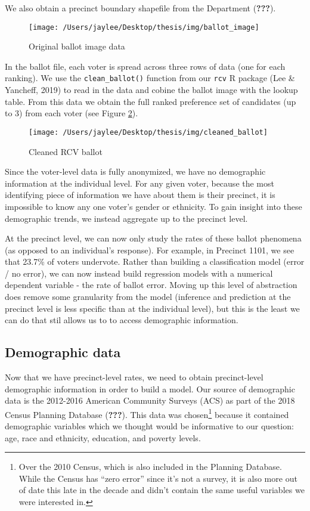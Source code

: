 \documentclass[12pt,twoside]{reedthesis}
\begin{document}
We also obtain a precinct boundary shapefile from the Department ({\textbf{???}}).
\begin{figure}
\texttt{[image: /Users/jaylee/Desktop/thesis/img/ballot\_image]} \caption{Original ballot image data}\label{fig:ballot-image}
\end{figure}
In the ballot file, each voter is spread across three rows of data (one for each ranking). We use the \texttt{clean\_ballot()} function from our \texttt{rcv} R package (Lee \& Yancheff, 2019) to read in the data and cobine the ballot image with the lookup table. From this data we obtain the full ranked preference set of candidates (up to 3) from each voter (see Figure \ref{fig:cleaned-ballot}).
\begin{figure}
\texttt{[image: /Users/jaylee/Desktop/thesis/img/cleaned\_ballot]} \caption{Cleaned RCV ballot}\label{fig:cleaned-ballot}
\end{figure}
Since the voter-level data is fully anonymized, we have no demographic information at the individual level. For any given voter, because the most identifying piece of information we have about them is their precinct, it is impossible to know any one voter's gender or ethnicity. To gain insight into these demographic trends, we instead aggregate up to the precinct level.

At the precinct level, we can now only study the rates of these ballot phenomena (as opposed to an individual's response). For example, in Precinct 1101, we see that 23.7\% of voters undervote. Rather than building a classification model (error / no error), we can now instead build regression models with a numerical dependent variable - the rate of ballot error. Moving up this level of abstraction does remove some granularity from the model (inference and prediction at the precinct level is less specific than at the individual level), but this is the least we can do that stil allows us to to access demographic information.

\hypertarget{demographic-data}{%
\subsection{Demographic data}\label{demographic-data}}

Now that we have precinct-level rates, we need to obtain precinct-level demographic information in order to build a model. Our source of demographic data is the 2012-2016 American Community Surveys (ACS) as part of the 2018 Census Planning Database ({\textbf{???}}). This data was chosen\footnote{Over the 2010 Census, which is also included in the Planning Database. While the Census has ``zero error'' since it's not a survey, it is also more out of date this late in the decade and didn't contain the same useful variables we were interested in.} because it contained demographic variables which we thought would be informative to our question: age, race and ethnicity, education, and poverty levels.
\end{document}
